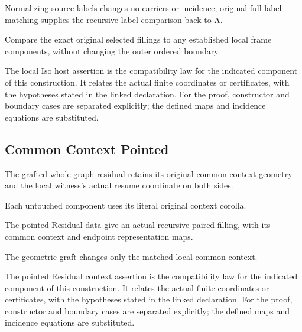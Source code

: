 Normalizing source labels changes no carriers or incidence; original full-label matching supplies the recursive label comparison back to A.
\par{}

Compare the exact original selected fillings to any established local frame components, without changing the outer ordered boundary.
\par{}

The local Iso host assertion is the compatibility law for the indicated component of this construction. It relates the actual finite coordinates or certificates, with the hypotheses stated in the linked declaration.
For the proof, constructor and boundary cases are separated explicitly; the defined maps and incidence equations are substituted.
\par{}

\subsection{Common Context Pointed}
The grafted whole-graph residual retains its original common-context geometry and the local witness's actual resume coordinate on both sides.

Each untouched component uses its literal original context corolla.
\par{}

The pointed Residual data give an actual recursive paired filling, with its common context and endpoint representation maps.
\par{}

The geometric graft changes only the matched local common context.
\par{}

The pointed Residual context assertion is the compatibility law for the indicated component of this construction. It relates the actual finite coordinates or certificates, with the hypotheses stated in the linked declaration.
For the proof, constructor and boundary cases are separated explicitly; the defined maps and incidence equations are substituted.
\par{}

